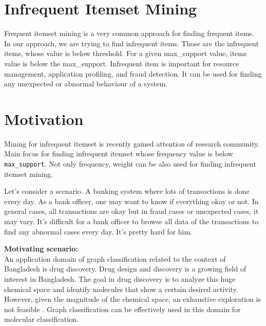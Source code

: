 \section{Infrequent Itemset Mining} \label{sec:graph_mining}
%
Frequent itemset mining is a very common approach for finding frequent items. In our approach, we are trying to find infrequent items. Those  are the infrequent items, whose value is below threshold. For a given max{\_}support value, items value is below the max{\_}support. Infrequent item is important for resource management, application profiling, and fraud detection. It can be used for finding any unexpected or abnormal behaviour of a system. 

%
%
%



\section{Motivation}
%
Mining for infrequent itemset is recently gained attention of research community. Main focus for finding infrequent itemset whose frequency value is below \texttt{max\_support}. Not only frequency, weight can be also used for finding infrequent itemset mining. \\

\par
Let’s consider a scenario. A banking system where lots of transactions is done every day. As a bank officer, one may want to know if everything okay or not. In general cases, all transactions are okay but in fraud cases or unexpected cases, it may vary. It’s difficult for a bank officer to browse all data of the transactions to find any abnormal cases every day. It’s pretty hard for him. \\
\iffalse
%
\par \textbf{Motivating scenario:} \\
An application domain of graph classification related to the context of Bangladesh is drug discovery. Drug design and discovery is a growing field of interest in Bangladesh. The goal in drug discovery is to analyze this huge chemical space and identify molecules that show a certain desired activity. However, given the magnitude of the chemical space, an exhaustive exploration is not feasible \cite{drug}. Graph classification can be effectively used in this domain for molecular classification. \\
%
%

